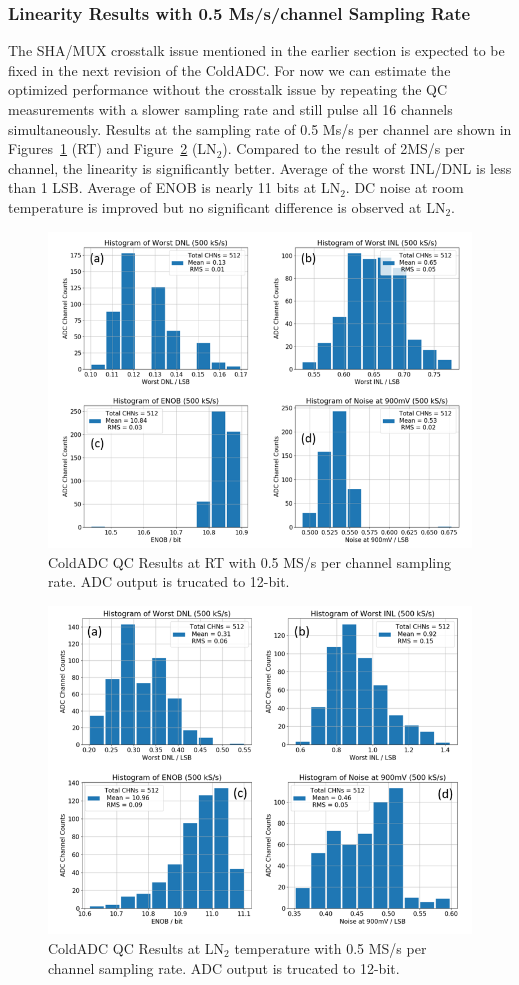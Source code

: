 \subsubsection{Linearity Results with 0.5 Ms/s/channel Sampling Rate}
The SHA/MUX crosstalk issue mentioned in the earlier section is expected to be fixed in the next revision of the ColdADC.
For now we can estimate the optimized performance without the crosstalk issue by repeating the QC measurements with a slower 
sampling rate and still pulse all 16 channels simultaneously.
Results at the sampling rate of 0.5 Ms/s per channel are shown in Figures~\ref{fig:qc_lin500Kwarm} (RT) and Figure~\ref{fig:qc_lin500Kcold} (LN$_2$). 
Compared to the result of 2MS/s per channel, the linearity is significantly better. Average of the worst INL/DNL is less than 1 LSB.
Average of ENOB is nearly 11 bits at LN$_2$.  DC noise at room temperature is improved but no significant difference is observed at LN$_2$.
\begin{figure}[h!]
\centering
  \includegraphics[width=0.85\linewidth]{figures/qc_lin500Kwarm.png}
  \caption{ColdADC QC Results at RT with 0.5 MS/s per channel sampling rate. ADC output is trucated to 12-bit.}
  \label{fig:qc_lin500Kwarm}
\end{figure}
\begin{figure}[h!]
\centering
  \includegraphics[width=0.85\linewidth]{figures/qc_lin500Kcold.png}
  \caption{ColdADC QC Results at LN$_2$ temperature with 0.5 MS/s per channel sampling rate. ADC output is trucated to 12-bit.}
  \label{fig:qc_lin500Kcold}
\end{figure}
